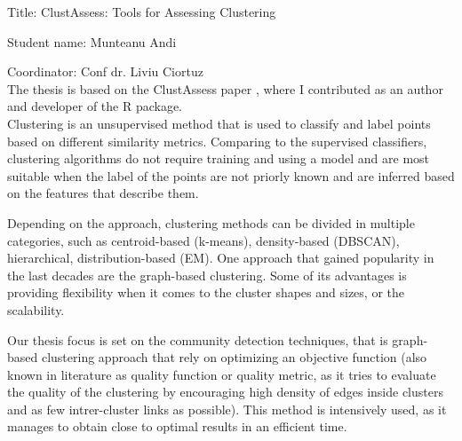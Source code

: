 \documentclass[12pt]{report}
\begin{document}
    
    

    
    
    
    
    \tableofcontents

    \setcounter{page}{1}
    
    
    
    
    
    
    
    
    
    
    \newpage

    Title: ClustAssess: Tools for Assessing Clustering

    Student name: Munteanu Andi
    
    Coordinator: Conf dr. Liviu Ciortuz \\

    The thesis is based on the ClustAssess paper \cite{clustassess}, where I contributed as an author and developer of the R package. \\

    
    Clustering is an unsupervised method that is used to classify and label points based on different similarity metrics. Comparing to the supervised classifiers, clustering algorithms do not require training and using a model and are most suitable when the label of the points are not priorly known and are inferred based on the features that describe them.

    Depending on the approach, clustering methods can be divided in multiple categories, such as centroid-based (k-means), density-based (DBSCAN), hierarchical, distribution-based (EM). One approach that gained popularity in the last decades are the graph-based clustering. Some of its advantages is providing flexibility when it comes to the cluster shapes and sizes, or the scalability.

    Our thesis focus is set on the community detection techniques, that is graph-based clustering approach that rely on optimizing an objective function (also known in literature as quality function or quality metric, as it tries to evaluate the quality of the clustering by encouraging high density of edges inside clusters and as few intrer-cluster links as possible). This method is intensively used, as it manages to obtain close to optimal results in an efficient time. 
\end{document}
